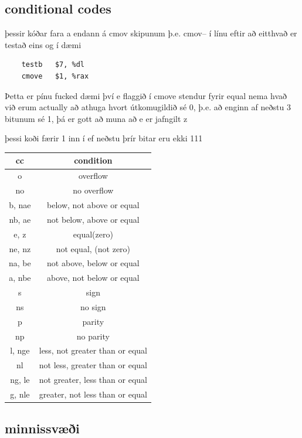 \documentclass{article}
\begin{document}
\subsection{conditional codes}


þessir kóðar fara a endann á cmov skipunum þ.e. cmov-- í línu eftir að eitthvað er testað eins og í dæmi 

\begin{verbatim}
    testb   $7, %dl
    cmove   $1, %rax
\end{verbatim}

Þetta er pínu fucked dæmi því e flaggið í cmove stendur fyrir equal nema hvað við erum actually að athuga hvort útkomugildið sé 0, þ.e. að enginn af neðstu 3 bitunum sé 1, þá er gott að muna að e er jafngilt z

þessi koði færir 1 inn í  ef neðstu þrír bitar  eru ekki 111

\begin{tabular}{|c|c|}
\hline
     \textbf{cc}& \textbf{condition}  \\ \hline
    o  & overflow \\ \hline
    no & no overflow \\ \hline
    b, nae & below, not above or equal \\ \hline
    nb, ae & not below, above or equal \\ \hline
    e, z & equal(zero) \\ \hline
    ne, nz & not equal, (not zero) \\ \hline
    na, be & not above, below or equal \\ \hline
    a, nbe & above, not below or equal \\ \hline
    s & sign \\ \hline
    ns & no sign \\ \hline
    p & parity \\ \hline
    np & no parity \\\hline
    l, nge & less, not greater than or equal \\ \hline
    nl & not less, greater than or equal \\ \hline
    ng, le & not greater, less than or equal\\ \hline
    g, nle & greater, not less than or equal \\ \hline
\end{tabular}

\subsection{minnissvæði}
\end{document}

